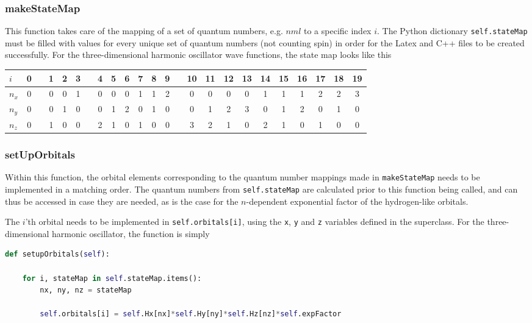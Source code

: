 \subsubsection{makeStateMap}

This function takes care of the mapping of a set of quantum numbers, e.g. $nml$ to a specific index $i$. The Python dictionary \verb+self.stateMap+ must be filled with values for every unique set of quantum numbers (not counting spin) in order for the Latex and C++ files to be created successfully. For the three-dimensional harmonic oscillator wave functions, the state map looks like this

\begin{center}
\begin{tabular}{l|ccccccccccccccccccccccc}
$i$   &  0 & & 1 &  2 &  3 & & 4 &  5 &  6 &  7 &  8 &  9 & & 10 &  11 &  12 &  13 &  14 &  15 &  16 &  17 &  18 & 19 \\
\hline
$n_x$ &  0 & & 0 &  0 &  1 & & 0 &  0 &  0 &  1 &  1 &  2 & & 0 &  0 &  0 &  0 &  1 &  1 &  1 &  2 &  2 &  3 \\
$n_y$ &  0 & & 0 &  1 &  0 & & 0 &  1 &  2 &  0 &  1 &  0 & & 0 &  1 &  2 &  3 &  0 &  1 &  2 &  0 &  1 &  0 \\
$n_z$ &  0 & & 1 &  0 &  0 & & 2 &  1 &  0 &  1 &  0 &  0 & & 3 &  2 &  1 &  0 &  2 &  1 &  0 &  1 &  0 &  0 
\end{tabular}
\end{center}

\subsubsection{setUpOrbitals}

Within this function, the orbital elements corresponding to the quantum number mappings made in \verb+makeStateMap+ needs to be implemented in a matching order. The quantum numbers from \verb+self.stateMap+ are calculated prior to this function being called, and can thus be accessed in case they are needed, as is the case for the $n$-dependent exponential factor of the hydrogen-like orbitals.

The $i$'th orbital needs to be implemented in \verb+self.orbitals[i]+, using the \verb+x+, \verb+y+ and \verb+z+ variables defined in the superclass. For the three-dimensional harmonic oscillator, the function is simply

\vspace{0.25cm}
\begin{lstlisting}[language=Python, otherkeywords={self}]
def setupOrbitals(self):
      
    for i, stateMap in self.stateMap.items():
        nx, ny, nz = stateMap
        
        self.orbitals[i] = self.Hx[nx]*self.Hy[ny]*self.Hz[nz]*self.expFactor
  
\end{lstlisting}

